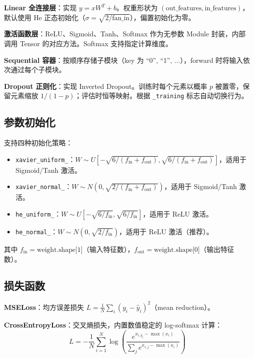 \documentclass[12pt,a4paper]{ctexart}
\begin{document}
\textbf{Linear 全连接层}：实现 $y = xW^T + b$。权重形状为 $(\text{out\_features}, \text{in\_features})$，默认使用 He 正态初始化（$\sigma = \sqrt{2/\text{fan\_in}}$），偏置初始化为零。

\textbf{激活函数层}：ReLU、Sigmoid、Tanh、Softmax 作为无参数 Module 封装，内部调用 Tensor 的对应方法。Softmax 支持指定计算维度。

\textbf{Sequential 容器}：按顺序存储子模块（key 为 ``0'', ``1'', ...），forward 时将输入依次通过每个子模块。

\textbf{Dropout 正则化}：实现 Inverted Dropout。训练时每个元素以概率 $p$ 被置零，保留元素缩放 $1/(1-p)$；评估时恒等映射。根据 \texttt{\_training} 标志自动切换行为。

\subsection{参数初始化}

支持四种初始化策略：

\begin{itemize}
    \item \texttt{xavier\_uniform\_}：$W \sim U[-\sqrt{6/(f_{\text{in}}+f_{\text{out}})}, \sqrt{6/(f_{\text{in}}+f_{\text{out}})}]$，适用于 Sigmoid/Tanh 激活。
    \item \texttt{xavier\_normal\_}：$W \sim N(0, \sqrt{2/(f_{\text{in}}+f_{\text{out}})})$，适用于 Sigmoid/Tanh 激活。
    \item \texttt{he\_uniform\_}：$W \sim U[-\sqrt{6/f_{\text{in}}}, \sqrt{6/f_{\text{in}}}]$，适用于 ReLU 激活。
    \item \texttt{he\_normal\_}：$W \sim N(0, \sqrt{2/f_{\text{in}}})$，适用于 ReLU 激活（推荐）。
\end{itemize}

其中 $f_{\text{in}} = \text{weight.shape[1]}$（输入特征数），$f_{\text{out}} = \text{weight.shape[0]}$（输出特征数）。

\subsection{损失函数}

\textbf{MSELoss}：均方误差损失 $L = \frac{1}{N}\sum_i (y_i - \hat{y}_i)^2$（mean reduction）。

\textbf{CrossEntropyLoss}：交叉熵损失，内置数值稳定的 log-softmax 计算：
\begin{equation}
L = -\frac{1}{N}\sum_{i=1}^{N} \log\left(\frac{e^{x_{i,y_i} - \max(x_i)}}{\sum_j e^{x_{i,j} - \max(x_i)}}\right)
\end{equation}
\end{document}
